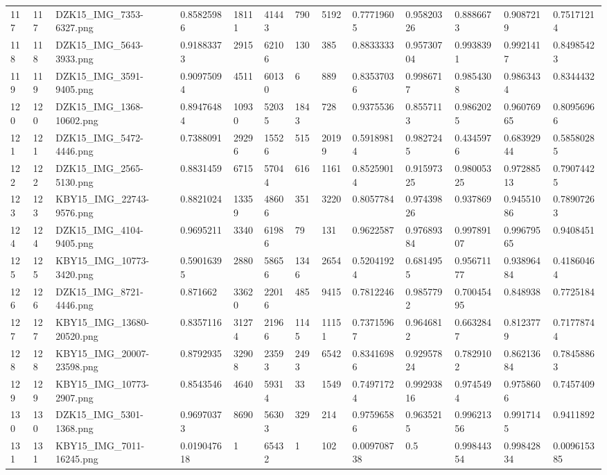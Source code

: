 \documentclass[11pt, a4paper, twoside]{report}
\begin{document}
\begin{longtable}[c]{@{}lllllllllllll@{}}
117 & 117 & DZK15\_IMG\_7353-6327.png & 0.85825986 & 18111 & 41443 & 790 & 5192 & 0.77719605 & 0.95820326 & 0.8886673 & 0.9087219 & 0.75171214 \\
118 & 118 & DZK15\_IMG\_5643-3933.png & 0.91883373 & 2915 & 62106 & 130 & 385 & 0.8833333 & 0.95730704 & 0.9938391 & 0.9921417 & 0.84985423 \\
119 & 119 & DZK15\_IMG\_3591-9405.png & 0.90975094 & 4511 & 60130 & 6 & 889 & 0.83537036 & 0.9986717 & 0.9854308 & 0.9863434 & 0.8344432 \\
120 & 120 & DZK15\_IMG\_1368-10602.png & 0.89476484 & 10930 & 52035 & 1843 & 728 & 0.9375536 & 0.8557113 & 0.9862025 & 0.96076965 & 0.80956966 \\
121 & 121 & DZK15\_IMG\_5472-4446.png & 0.7388091 & 29296 & 15526 & 515 & 20199 & 0.59189814 & 0.9827245 & 0.4345976 & 0.68392944 & 0.58580285 \\
122 & 122 & DZK15\_IMG\_2565-5130.png & 0.8831459 & 6715 & 57044 & 616 & 1161 & 0.85259014 & 0.91597325 & 0.98005325 & 0.97288513 & 0.79074425 \\
123 & 123 & KBY15\_IMG\_22743-9576.png & 0.8821024 & 13359 & 48606 & 351 & 3220 & 0.8057784 & 0.97439826 & 0.937869 & 0.94551086 & 0.78907263 \\
124 & 124 & DZK15\_IMG\_4104-9405.png & 0.9695211 & 3340 & 61986 & 79 & 131 & 0.9622587 & 0.97689384 & 0.99789107 & 0.99679565 & 0.9408451 \\
125 & 125 & KBY15\_IMG\_10773-3420.png & 0.59016395 & 2880 & 58656 & 1346 & 2654 & 0.52041924 & 0.6814955 & 0.95671177 & 0.93896484 & 0.41860464 \\
126 & 126 & DZK15\_IMG\_8721-4446.png & 0.871662 & 33620 & 22016 & 485 & 9415 & 0.7812246 & 0.9857792 & 0.70045495 & 0.848938 & 0.7725184 \\
127 & 127 & KBY15\_IMG\_13680-20520.png & 0.8357116 & 31274 & 21966 & 1145 & 11151 & 0.73715967 & 0.9646812 & 0.6632847 & 0.8123779 & 0.71778744 \\
128 & 128 & KBY15\_IMG\_20007-23598.png & 0.8792935 & 32908 & 23593 & 2493 & 6542 & 0.83416986 & 0.92957824 & 0.7829102 & 0.86213684 & 0.78458863 \\
129 & 129 & KBY15\_IMG\_10773-2907.png & 0.8543546 & 4640 & 59314 & 33 & 1549 & 0.74971724 & 0.99293816 & 0.9745494 & 0.9758606 & 0.7457409 \\
130 & 130 & DZK15\_IMG\_5301-1368.png & 0.96970373 & 8690 & 56303 & 329 & 214 & 0.97596586 & 0.9635215 & 0.99621356 & 0.9917145 & 0.9411892 \\
131 & 131 & KBY15\_IMG\_7011-16245.png & 0.019047618 & 1 & 65432 & 1 & 102 & 0.009708738 & 0.5 & 0.99844354 & 0.99842834 & 0.009615385 \\

\end{longtable}
\end{document}
